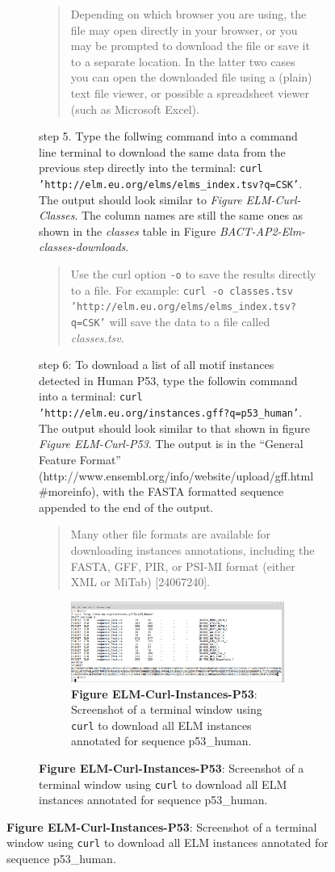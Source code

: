 {\begin{figure}[h!]
{{\begin{figure}[h!]
{{\begin{quote}
Depending on which browser you are using, the file may open directly in
your browser, or you may be prompted to download the file or save it to
a separate location. In the latter two cases you can open the downloaded
file using a (plain) text file viewer, or possible a spreadsheet viewer
(such as Microsoft Excel).
\end{quote}

step 5. Type the follwing command into a command line terminal to
download the same data from the previous step directly into the
terminal: \texttt{curl 'http://elm.eu.org/elms/elms\_index.tsv?q=CSK'}.
The output should look similar to \emph{Figure ELM-Curl-Classes}. The
column names are still the same ones as shown in the \emph{classes}
table in Figure \emph{BACT-AP2-Elm-classes-downloads}.

\begin{quote}
Use the curl option \texttt{-o} to save the results directly to a file.
For example:
\texttt{curl -o classes.tsv 'http://elm.eu.org/elms/elms\_index.tsv?q=CSK'}
will save the data to a file called \emph{classes.tsv}.
\end{quote}

step 6: To download a list of all motif instances detected in Human P53,
type the followin command into a terminal:
\texttt{curl 'http://elm.eu.org/instances.gff?q=p53\_human'}. The output
should look similar to that shown in figure \emph{Figure ELM-Curl-P53}.
The output is in the ``General Feature Format''
(http://www.ensembl.org/info/website/upload/gff.html\#moreinfo), with
the FASTA formatted sequence appended to the end of the output.

\begin{quote}
Many other file formats are available for downloading instances
annotations, including the FASTA, GFF, PIR, or PSI-MI format (either XML
or MiTab) {[}24067240{]}.
\end{quote}

\begin{figure}[h!]
\centering
\includegraphics[width=\textwidth]{Figures/BACT_2/elm_curl_instances_p53_human.png}
\caption{
\textbf{Figure ELM-Curl-Instances-P53}: Screenshot of a terminal window
using \texttt{curl} to download all ELM instances annotated for sequence
p53\_human.
}
\end{figure}

}}
\end{figure}}}
\end{figure}}
